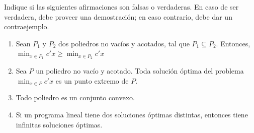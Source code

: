 Indique si las siguientes afirmaciones son falsas o verdaderas. En caso de ser verdadera, debe proveer una demostración; en caso contrario, debe dar un contraejemplo.  

\begin{enumerate}
\item Sean $P_1$ y $P_2$ dos poliedros no vacíos y acotados, tal que $P_1 \subseteq P_2$. Entonces,   $\min_{x\in P_1}{c'x} \geq \min_{x\in P_2}{c'x}$

\item Sea $P$ un poliedro no vacío y acotado. Toda solución óptima del  problema $\min_{x\in P}{c'x}$ es un punto extremo de $P$.

\item Todo poliedro es un conjunto convexo.

\item Si un programa lineal tiene dos soluciones óptimas distintas, entonces tiene infinitas soluciones óptimas. 
\end{enumerate}

